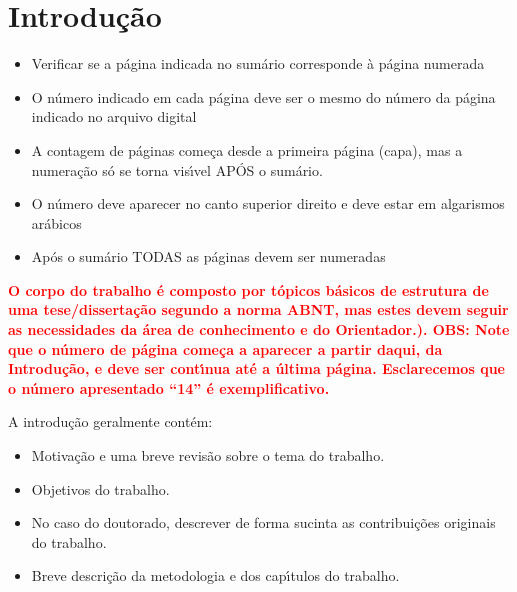 \printglossary[type=simbolos,title={Lista de símbolos}]
\cleardoublepage

\tableofcontents*
\cleardoublepage



\textual

\linenumbers
\chapter{Introdu\c{c}\~{a}o}
\label{cap:intro}

\begin{itemize}
    \item Verificar se a p\'{a}gina indicada no sum\'{a}rio corresponde \`{a} p\'{a}gina numerada
    \item O n\'{u}mero indicado em cada p\'{a}gina deve ser o mesmo do n\'{u}mero da p\'{a}gina indicado no arquivo digital
    \item A contagem de p\'{a}ginas come\c{c}a desde a primeira p\'{a}gina (capa), mas a numera\c{c}\~{a}o s\'{o} se torna vis\'{\i}vel AP\'{O}S o sum\'{a}rio.
    \item O n\'{u}mero deve aparecer no canto superior direito e deve estar em algarismos ar\'{a}bicos
    \item Ap\'{o}s o sum\'{a}rio TODAS as p\'{a}ginas devem ser numeradas
\end{itemize}


\textbf{\textcolor{red}{O corpo do trabalho \'{e} composto por t\'{o}picos b\'{a}sicos de estrutura de uma tese/disserta\c{c}\~{a}o segundo a norma ABNT, mas estes devem seguir as necessidades da \'{a}rea de conhecimento e do Orientador.).  OBS: Note que o n\'{u}mero de p\'{a}gina come\c{c}a a aparecer a partir daqui, da Introdu\c{c}\~{a}o, e deve ser cont\'{\i}nua at\'{e} a \'{u}ltima p\'{a}gina. Esclarecemos que o n\'{u}mero apresentado “14” \'{e} exemplificativo.   }}

A introdu\c{c}\~{a}o geralmente contém:

\begin{itemize}
    \item Motiva\c{c}\~{a}o e uma breve revis\~{a}o sobre o tema do trabalho.
    \item Objetivos do trabalho.
    \item No caso do doutorado, descrever de forma sucinta as contribui\c{c}\~{o}es originais do trabalho.
    \item Breve descri\c{c}\~{a}o da metodologia e dos cap\'{\i}tulos do trabalho.
\end{itemize}

